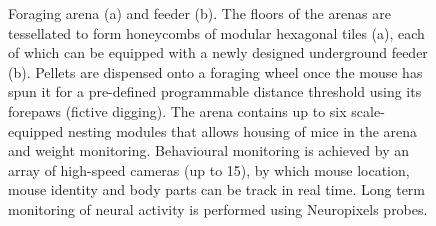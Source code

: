 
\begin{figure}
    \centering
    \hfill
    \caption{Foraging arena (a) and feeder (b).
    The floors of the arenas are tessellated to form honeycombs of modular
    hexagonal tiles (a), each of which can be equipped with a newly designed
    underground feeder (b).
    Pellets are dispensed onto a foraging wheel once the mouse has spun it for
    a pre-defined programmable distance threshold using its forepaws (fictive
    digging).
    The arena contains up to six scale-equipped nesting modules that allows
    housing of mice in the arena and weight monitoring.
    Behavioural monitoring is achieved by an array of high-speed cameras (up to
    15), by which mouse location, mouse identity and body parts can be track in
    real time.
    Long term monitoring of neural activity is performed using Neuropixels
    probes.
    }
    \label{fig:arena}
\end{figure}
